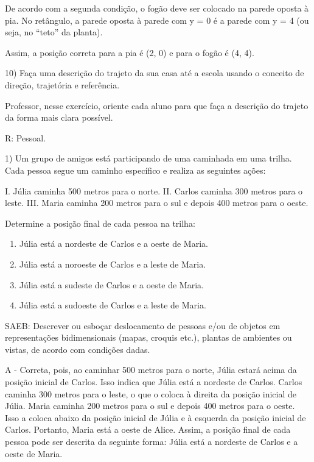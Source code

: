De acordo com a segunda condição, o fogão deve ser colocado na parede
oposta à pia. No retângulo, a parede oposta à parede com y = 0 é a
parede com y = 4 (ou seja, no ``teto'' da planta).

Assim, a posição correta para a pia é (2, 0) e para o fogão é (4, 4).

10) Faça uma descrição do trajeto da sua casa até a escola usando o
conceito de direção, trajetória e referência.

Professor, nesse exercício, oriente cada aluno para que faça a descrição
do trajeto da forma mais clara possível.

R: Pessoal.


1) Um grupo de amigos está participando de uma caminhada em uma trilha.
Cada pessoa segue um caminho específico e realiza as seguintes ações:

I. Júlia caminha 500 metros para o norte. II. Carlos caminha 300 metros
para o leste. III. Maria caminha 200 metros para o sul e depois 400
metros para o oeste.

Determine a posição final de cada pessoa na trilha:

\begin{enumerate}
\def\labelenumi{\Alph{enumi})}
\item
  Júlia está a nordeste de Carlos e a oeste de Maria.
\item
  Júlia está a noroeste de Carlos e a leste de Maria.
\item
  Júlia está a sudeste de Carlos e a oeste de Maria.
\item
  Júlia está a sudoeste de Carlos e a leste de Maria.
\end{enumerate}

SAEB: Descrever ou esboçar deslocamento de pessoas e/ou de objetos em
representações bidimensionais (mapas, croquis etc.), plantas de
ambientes ou vistas, de acordo com condições dadas.

A - Correta, pois, ao caminhar 500 metros para o norte, Júlia estará
acima da posição inicial de Carlos. Isso indica que Júlia está a
nordeste de Carlos. Carlos caminha 300 metros para o leste, o que o
coloca à direita da posição inicial de Júlia. Maria caminha 200 metros
para o sul e depois 400 metros para o oeste. Isso a coloca abaixo da
posição inicial de Júlia e à esquerda da posição inicial de Carlos.
Portanto, Maria está a oeste de Alice. Assim, a posição final de cada
pessoa pode ser descrita da seguinte forma: Júlia está a nordeste de
Carlos e a oeste de Maria.


